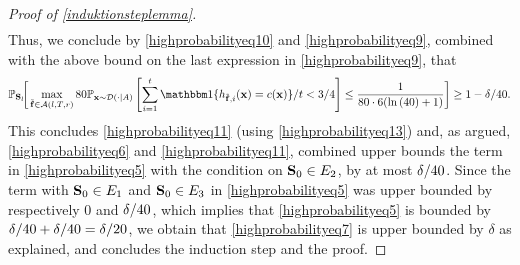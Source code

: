 \begin{proof}[Proof of \cref{induktionsteplemma}]
\begin{align*}
\end{align*}
Thus, we conclude by \cref{highprobabilityeq10} and \cref{highprobabilityeq9}, combined with the above bound on the last expression in \cref{highprobabilityeq9}, that
\begin{align*}
  \p_{\rS_{l}}\negmedspace\bigg[ \max_{\rf\in \cA(l,T,r)} 80\p_{\rx\sim \cD(\cdot| A)}
  \left[
  \sum_{i=1}^{t} \ind\{h_{\rf,i}(\rx)=c(\rx)\}/t< 3/4
 \right]\leq \frac{1}{80\cdot6(\ln{(\cnn )}+1)}\bigg]\geq 1- \delta/\cff.
\end{align*}
This concludes \cref{highprobabilityeq11} (using \cref{highprobabilityeq13}) and, as argued, \cref{highprobabilityeq6} and  \cref{highprobabilityeq11},  combined upper bounds the term in \cref{highprobabilityeq5} with the condition on $ \mathbf{S}_{0}\in E_{2} $, by at most $\delta/40$. Since the term with $ \mathbf{S}_{0}\in E_{1} $ and $ \mathbf{S}_{0}\in E_{3} $ in \cref{highprobabilityeq5}  was upper bounded by respectively $ 0 $ and $ \delta/40 $, which implies that \cref{highprobabilityeq5} is bounded by $ \delta/40 +\delta/40=\delta/20$, we obtain that \cref{highprobabilityeq7} is upper bounded by $ \delta $ as explained, and concludes the induction step and the proof.
\end{proof}

